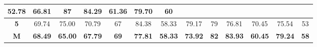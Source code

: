 \begin{table}[H]
{\begin{tabular}{c|cccc|cccc|cccc|}
			\multicolumn{1}{c|}{52.78} &
			\multicolumn{1}{c|}{66.81} &
			87 &
			\multicolumn{1}{c|}{84.29} &
			\multicolumn{1}{c|}{61.36} &
			\multicolumn{1}{c|}{79.70} &
			60 \\ \hline
			\multicolumn{1}{|c|}{\textbf{5}} &
			\multicolumn{1}{c|}{69.74} &
			\multicolumn{1}{c|}{75.00} &
			\multicolumn{1}{c|}{70.79} &
			67 &
			\multicolumn{1}{c|}{84.38} &
			\multicolumn{1}{c|}{58.33} &
			\multicolumn{1}{c|}{79.17} &
			79 &
			\multicolumn{1}{c|}{76.81} &
			\multicolumn{1}{c|}{70.45} &
			\multicolumn{1}{c|}{75.54} &
			53 \\ \hline
			\multicolumn{1}{|c|}{{\color[HTML]{00009B} \textbf{M}}} &
			\multicolumn{1}{c|}{{\color[HTML]{00009B} \textbf{68.49}}} &
			\multicolumn{1}{c|}{{\color[HTML]{00009B} \textbf{65.00}}} &
			\multicolumn{1}{c|}{{\color[HTML]{00009B} \textbf{67.79}}} &
			{\color[HTML]{00009B} \textbf{69}} &
			\multicolumn{1}{c|}{{\color[HTML]{00009B} \textbf{77.81}}} &
			\multicolumn{1}{c|}{{\color[HTML]{00009B} \textbf{58.33}}} &
			\multicolumn{1}{c|}{{\color[HTML]{00009B} \textbf{73.92}}} &
			{\color[HTML]{00009B} \textbf{82}} &
			\multicolumn{1}{c|}{{\color[HTML]{00009B} \textbf{83.93}}} &
			\multicolumn{1}{c|}{{\color[HTML]{00009B} \textbf{60.45}}} &
			\multicolumn{1}{c|}{{\color[HTML]{00009B} \textbf{79.24}}} &
			{\color[HTML]{00009B} \textbf{58}} \\ \hline
		\end{tabular}%
	}
\end{table}
